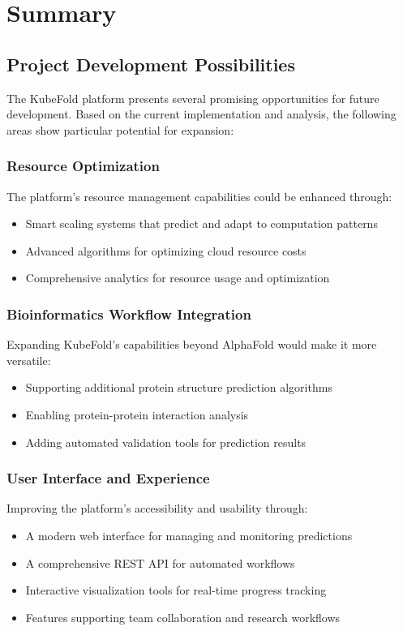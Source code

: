 \chapter{Summary}

\section{Project Development Possibilities}

The KubeFold platform presents several promising opportunities for future development.
Based on the current implementation and analysis, the following areas show particular potential for expansion:

\subsection{Resource Optimization}
The platform's resource management capabilities could be enhanced through:
\begin{itemize}
    \item Smart scaling systems that predict and adapt to computation patterns
    \item Advanced algorithms for optimizing cloud resource costs
    \item Comprehensive analytics for resource usage and optimization
\end{itemize}

\subsection{Bioinformatics Workflow Integration}
Expanding KubeFold's capabilities beyond AlphaFold would make it more versatile:
\begin{itemize}
    \item Supporting additional protein structure prediction algorithms
    \item Enabling protein-protein interaction analysis
    \item Adding automated validation tools for prediction results
\end{itemize}

\subsection{User Interface and Experience}
Improving the platform's accessibility and usability through:
\begin{itemize}
    \item A modern web interface for managing and monitoring predictions
    \item A comprehensive REST API for automated workflows
    \item Interactive visualization tools for real-time progress tracking
    \item Features supporting team collaboration and research workflows
\end{itemize}

